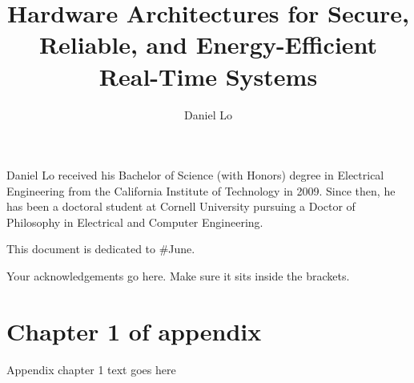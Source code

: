 \documentclass[phd,tocprelim]{cornell}
\title {Hardware Architectures for Secure, Reliable, and Energy-Efficient Real-Time Systems}
\author {Daniel Lo}
\begin{document}
\maketitle
\makecopyright

\begin{abstract}

\end{abstract}

\begin{biosketch}
Daniel Lo received his Bachelor of Science (with Honors) degree in Electrical
Engineering from the California Institute of Technology in 2009. Since then, he
has been a doctoral student at Cornell University pursuing a Doctor of
Philosophy in Electrical and Computer Engineering.
\end{biosketch}

\begin{dedication}
This document is dedicated to \#June.
\end{dedication}

\begin{acknowledgements}
Your acknowledgements go here. Make sure it sits inside the brackets.
\end{acknowledgements}

\contentspage
\tablelistpage
\figurelistpage

\normalspacing \setcounter{page}{1} 
\pagestyle{cornell} \addtolength{\parskip}{0.5\baselineskip}











\appendix
\chapter{Chapter 1 of appendix}
Appendix chapter 1 text goes here


\end{document}
